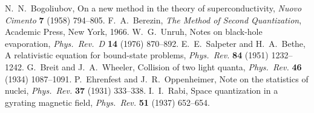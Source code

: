  N.~N.~Bogoliubov, On a new method in the theory of superconductivity, \emph{Nuovo Cimento} \textbf{7} (1958) 794--805.
 F.~A.~Berezin, \emph{The Method of Second Quantization}, Academic Press, New York, 1966.
 W.~G.~Unruh, Notes on black-hole evaporation, \emph{Phys.\ Rev.\ D} \textbf{14} (1976) 870--892.
 E.~E.~Salpeter and H.~A.~Bethe, A relativistic equation for bound-state problems, \emph{Phys.\ Rev.} \textbf{84} (1951) 1232--1242.
 G.~Breit and J.~A.~Wheeler, Collision of two light quanta, \emph{Phys.\ Rev.} \textbf{46} (1934) 1087--1091.
 P.~Ehrenfest and J.~R.~Oppenheimer, Note on the statistics of nuclei, \emph{Phys.\ Rev.} \textbf{37} (1931) 333--338.
 I.~I.~Rabi, Space quantization in a gyrating magnetic field, \emph{Phys.\ Rev.} \textbf{51} (1937) 652--654.
